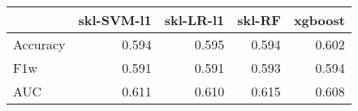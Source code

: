 \begin{tabular}{lrrrr}
\toprule
{} &  skl-SVM-l1 &  skl-LR-l1 &  skl-RF &  xgboost \\
\midrule
Accuracy &       0.594 &      0.595 &   0.594 &    0.602 \\
F1w      &       0.591 &      0.591 &   0.593 &    0.594 \\
AUC      &       0.611 &      0.610 &   0.615 &    0.608 \\
\bottomrule
\end{tabular}
